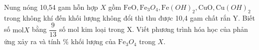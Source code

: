 \begin{vd}
	Nung nóng 10,54 gam hỗn hợp $X$ gồm $\mathrm{FeO}, \mathrm{Fe}_3 O_4, \mathrm{Fe}(OH)_2, \mathrm{CuO}, \mathrm{Cu}(OH)_2$ trong không khí đến khối lượng không đổi thì thu được 10,4 gam chất rắn Y. Biết số $\mathrm{mol} X$ bằng $\dfrac{9}{13}$ số mol kim loại trong X. Viết phương trình hóa học của phản ứng xảy ra và tính \% khối lượng của $\mathrm{Fe}_3 O_4$ trong $X$.
	\loigiai{
	}
\end{vd}


